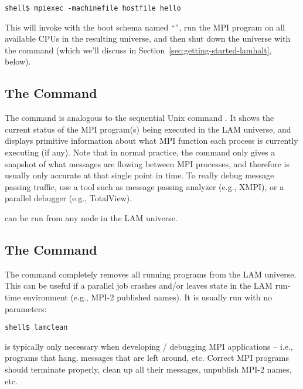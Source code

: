 \lstset{style=lam-cmdline}
\begin{lstlisting}
shell$ mpiexec -machinefile hostfile hello
\end{lstlisting}

This will invoke  with the boot schema named
``'', run the MPI program  on all available
CPUs in the resulting universe, and then shut down the universe with
the  command (which we'll discuss in
Section~\ref{sec:getting-started-lamhalt}, below).


\subsection{The  Command}

The  command is analogous to the sequential Unix command
.  It shows the current status of the MPI program(s) being
executed in the LAM universe, and displays primitive information about
what MPI function each process is currently executing (if any).  Note
that in normal practice, the  command only gives a
snapshot of what messages are flowing between MPI processes, and
therefore is usually only accurate at that single point in time.  To
really debug message passing traffic, use a tool such as message
passing analyzer (e.g., XMPI), or a parallel debugger (e.g.,
TotalView).

 can be run from any node in the LAM universe.


\subsection{The  Command}

The  command completely removes all running programs
from the LAM universe.  This can be useful if a parallel job crashes
and/or leaves state in the LAM run-time environment (e.g., MPI-2
published names).  It is usually run with no parameters:

\lstset{style=lam-cmdline}
\begin{lstlisting}
shell$ lamclean
\end{lstlisting}

 is typically only necessary when developing / debugging
MPI applications -- i.e., programs that hang, messages that are left
around, etc.  Correct MPI programs should terminate properly, clean up
all their messages, unpublish MPI-2 names, etc.

